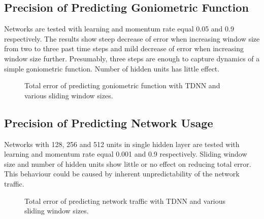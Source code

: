 \documentclass[12pt,oneside]{fithesis2}
\begin{document}
\subsection{Precision of Predicting Goniometric Function}
Networks are tested with learning and momentum rate equal 0.05 and 0.9 respectively. The results show steep decrease of error when increasing window size from two to three past time steps and mild decrease of error when increasing window size further. Presumably, three steps are enough to capture dynamics of a simple goniometric function. Number of hidden units has little effect.

\begin{figure}[H]
\centering
\caption{Total error of predicting goniometric function with TDNN and various sliding window sizes.}
\end{figure}

\subsection{Precision of Predicting Network Usage}
Networks with 128, 256 and 512 units in single hidden layer are tested with learning and momentum rate equal 0.001 and 0.9 respectively. Sliding window size and number of hidden units show little or no effect on reducing total error. This behaviour could be caused by inherent unpredictability of the network traffic.


\begin{figure}[H]
\centering
\caption{Total error of predicting network traffic with TDNN and various sliding window sizes.}
\end{figure}
\end{document}
